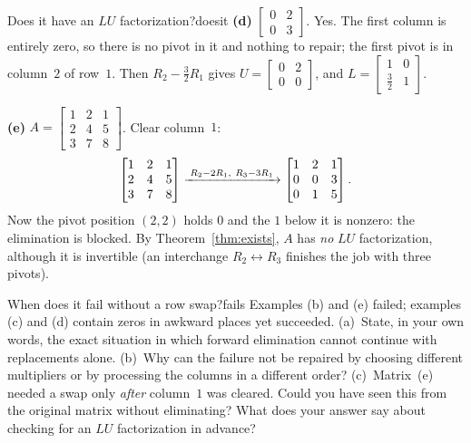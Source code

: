 \documentclass[11pt]{article}
\begin{document}
\begin{exmp}{Does it have an $LU$ factorization?}{doesit}
\textbf{(d)} $\begin{bmatrix}0&2\\0&3\end{bmatrix}$. Yes. The first column is entirely zero, so there is no pivot in it and nothing to repair; the first pivot is in column~$2$ of row~$1$. Then $R_2-\tfrac32R_1$ gives $U=\begin{bmatrix}0&2\\0&0\end{bmatrix}$, and $L=\begin{bmatrix}1&0\\\tfrac32&1\end{bmatrix}$.

\textbf{(e)} $A=\begin{bmatrix}1&2&1\\2&4&5\\3&7&8\end{bmatrix}$. Clear column~$1$:
\[
\begin{bmatrix}1&2&1\\2&4&5\\3&7&8\end{bmatrix}\rops{R_2-2R_1,\ R_3-3R_1}\begin{bmatrix}1&2&1\\0&0&3\\0&1&5\end{bmatrix}.
\]
Now the pivot position $(2,2)$ holds $0$ and the $1$ below it is nonzero: the elimination is blocked. By Theorem~\ref{thm:exists}, $A$ has \emph{no} $LU$ factorization, although it is invertible (an interchange $R_2\leftrightarrow R_3$ finishes the job with three pivots).
\end{exmp}

\begin{think}{When does it fail without a row swap?}{fails}
Examples (b) and (e) failed; examples (c) and (d) contain zeros in awkward places yet succeeded. (a)~State, in your own words, the exact situation in which forward elimination cannot continue with replacements alone. (b)~Why can the failure not be repaired by choosing different multipliers or by processing the columns in a different order? (c)~Matrix~(e) needed a swap only \emph{after} column~$1$ was cleared. Could you have seen this from the original matrix without eliminating? What does your answer say about checking for an $LU$ factorization in advance?
\end{think}
\end{document}
